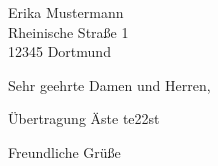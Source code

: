 \documentclass[version=last, Briefvorlage]{scrlttr2}
\begin{document}
%
\begin{letter}{%
		Erika Mustermann\\
		Rheinische Straße 1\\
		12345 Dortmund%
	}
	\opening{Sehr geehrte Damen und Herren,}
	Übertragung Äste te22st
	\closing{Freundliche Grüße}
\end{letter}
%
\end{document}

